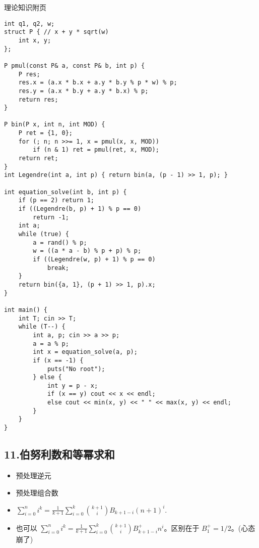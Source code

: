 \documentclass[]{article}
\providecommand{\tightlist}{%
  \setlength{\itemsep}{0pt}\setlength{\parskip}{0pt}}
\begin{document}
理论知识附页

\begin{verbatim}
int q1, q2, w;
struct P { // x + y * sqrt(w)
    int x, y;
};

P pmul(const P& a, const P& b, int p) {
    P res;
    res.x = (a.x * b.x + a.y * b.y % p * w) % p;
    res.y = (a.x * b.y + a.y * b.x) % p;
    return res;
}

P bin(P x, int n, int MOD) {
    P ret = {1, 0};
    for (; n; n >>= 1, x = pmul(x, x, MOD))
        if (n & 1) ret = pmul(ret, x, MOD);
    return ret;
}
int Legendre(int a, int p) { return bin(a, (p - 1) >> 1, p); }

int equation_solve(int b, int p) {
    if (p == 2) return 1;
    if ((Legendre(b, p) + 1) % p == 0)
        return -1;
    int a;
    while (true) {
        a = rand() % p;
        w = ((a * a - b) % p + p) % p;
        if ((Legendre(w, p) + 1) % p == 0)
            break;
    }
    return bin({a, 1}, (p + 1) >> 1, p).x;
}

int main() {
    int T; cin >> T;
    while (T--) {
        int a, p; cin >> a >> p;
        a = a % p;
        int x = equation_solve(a, p);
        if (x == -1) {
            puts("No root");
        } else {
            int y = p - x;
            if (x == y) cout << x << endl;
            else cout << min(x, y) << " " << max(x, y) << endl;
        }
    }
}
\end{verbatim}

\hypertarget{ux4f2fux52aaux5229ux6570ux548cux7b49ux5e42ux6c42ux548c}{%
\subsection{11.伯努利数和等幂求和}\label{ux4f2fux52aaux5229ux6570ux548cux7b49ux5e42ux6c42ux548c}}

\begin{itemize}
\tightlist
\item
  预处理逆元
\item
  预处理组合数
\item
  \(\sum_{i=0}^n i^k = \frac{1}{k+1} \sum_{i=0}^k \binom{k+1}{i} B_{k+1-i} (n+1)^i\).
\item
  也可以
  \(\sum_{i=0}^n i^k = \frac{1}{k+1} \sum_{i=0}^k \binom{k+1}{i} B^+_{k+1-i} n^i\)。区别在于
  \(B^+_1 =1/2\)。(心态崩了)
\end{itemize}
\end{document}
